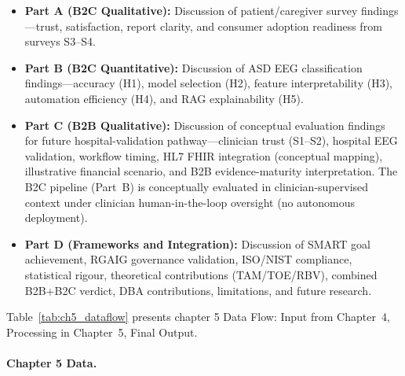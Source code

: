 \begin{itemize}[leftmargin=*, itemsep=3pt]
    \item \textbf{Part A (B2C Qualitative):} Discussion of patient/caregiver survey findings---trust, satisfaction, report clarity, and consumer adoption readiness from surveys S3--S4.
    \item \textbf{Part B (B2C Quantitative):} Discussion of ASD EEG classification findings---accuracy (H1), model selection (H2), feature interpretability (H3), automation efficiency (H4), and RAG explainability (H5).
    \item \textbf{Part C (B2B Qualitative):} Discussion of conceptual evaluation findings for future hospital-validation pathway---clinician trust (S1--S2), hospital EEG validation, workflow timing, HL7 FHIR integration (conceptual mapping), illustrative financial scenario, and B2B evidence-maturity interpretation. The B2C pipeline (Part~B) is conceptually evaluated in clinician-supervised context under clinician human-in-the-loop oversight (no autonomous deployment).
    \item \textbf{Part D (Frameworks and Integration):} Discussion of SMART goal achievement, RGAIG governance validation, ISO/NIST compliance, statistical rigour, theoretical contributions (TAM/TOE/RBV), combined B2B+B2C verdict, DBA contributions, limitations, and future research.
\end{itemize}

\noindent Table~\ref{tab:ch5_dataflow} presents chapter 5 Data Flow: Input from Chapter~4, Processing in Chapter~5, Final Output.

\paragraph{Chapter 5 Data.}




